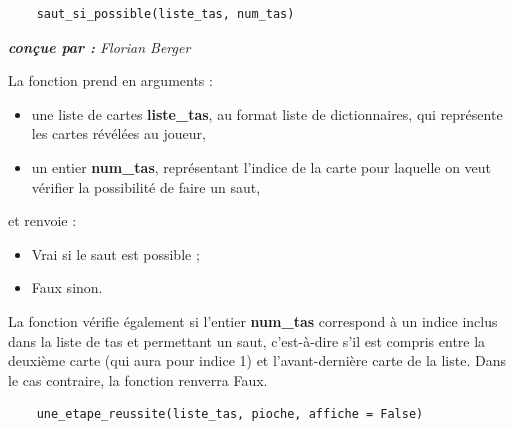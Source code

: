 \documentclass[titlepage]{article}
\begin{document}
\label{fun : saut_si_possible}
\noindent	\begin{minipage}{\textwidth}
	\begin{lstlisting}
	saut_si_possible(liste_tas, num_tas)
	\end{lstlisting}	
	\end{minipage}

\emph{\textbf{conçue par : } Florian Berger} \vspace{2mm}\par
La fonction prend en arguments :
	\begin{itemize}
	\item une liste de cartes \textbf{liste\_tas}, au format liste de dictionnaires, qui représente les cartes révélées au joueur, 
	\item un entier \textbf{num\_tas}, représentant l'indice de la carte pour laquelle on veut vérifier la possibilité de faire un saut,
	\end{itemize}
\par 
et renvoie :
	\begin{itemize}
	\item Vrai si le saut est possible ;
	\item Faux sinon.
	\end{itemize}
\par
La fonction vérifie également si l'entier \textbf{num\_tas} correspond à un indice inclus dans la liste de tas et permettant un saut, c'est-à-dire s'il est compris entre la deuxième carte (qui aura pour indice 1) et l'avant-dernière carte de la liste. Dans le cas contraire, la fonction renverra Faux.
\vspace{5mm}

\label{fun : une_etape_reussite}
\noindent	\begin{minipage}{\textwidth}
	\begin{lstlisting}
	une_etape_reussite(liste_tas, pioche, affiche = False)
	\end{lstlisting}	
	\end{minipage}
\end{document}
